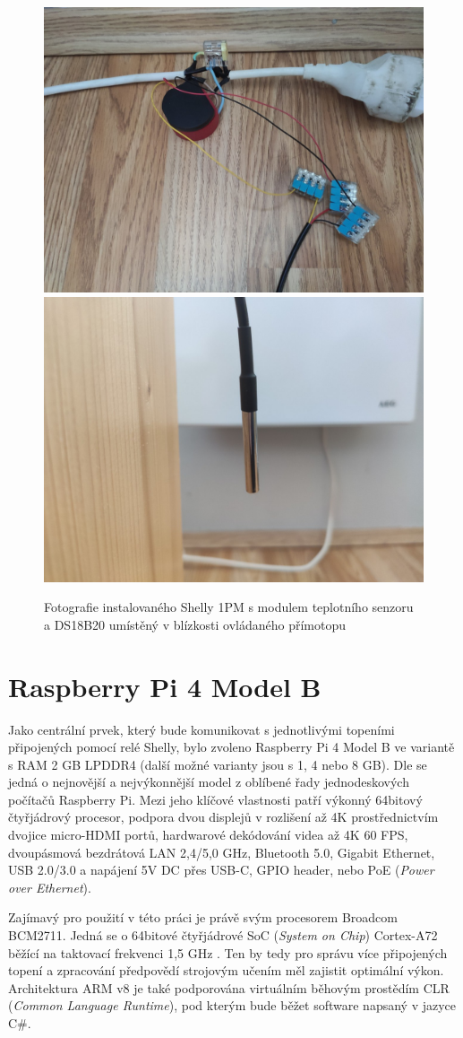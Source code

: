 \begin{figure}[hbt]
\centering
\includegraphics[width=0.47\linewidth]{obrazky-figures/shelly-photo1.png}
\includegraphics[width=0.47\linewidth]{obrazky-figures/shelly-photo2.png}
\caption{Fotografie instalovaného Shelly 1PM s modulem teplotního senzoru a DS18B20 umístěný v blízkosti ovládaného přímotopu}
\end{figure}

\section{Raspberry Pi 4 Model B}
Jako centrální prvek, který bude komunikovat s jednotlivými topeními připojených pomocí relé Shelly, bylo zvoleno Raspberry Pi 4 Model B ve variantě s RAM 2 GB LPDDR4 (další možné varianty jsou s 1, 4 nebo 8 GB). Dle \cite{raspberry_pi} se jedná o nejnovější a nejvýkonnější model z oblíbené řady jednodeskových počítačů Raspberry Pi. Mezi jeho klíčové vlastnosti patří výkonný 64bitový čtyřjádrový procesor, podpora dvou displejů v rozlišení až 4K prostřednictvím dvojice micro-HDMI portů, hardwarové dekódování videa až 4K 60 FPS, dvoupásmová bezdrátová LAN 2,4/5,0 GHz, Bluetooth 5.0, Gigabit Ethernet, USB 2.0/3.0 a napájení 5V DC přes USB-C, GPIO header, nebo PoE ({\it Power over Ethernet}).

Zajímavý pro použití v této práci je právě svým procesorem Broadcom BCM2711. Jedná se o 64bitové čtyřjádrové SoC ({\it System on Chip}) Cortex-A72 běžící na taktovací frekvenci 1,5 GHz \cite{raspberry_pi}. Ten by tedy pro správu více připojených topení a zpracování předpovědí strojovým učením měl zajistit optimální výkon. Architektura ARM v8 je také podporována virtuálním běhovým prostědím CLR ({\it Common Language Runtime}), pod kterým bude běžet software napsaný v jazyce C\#.

